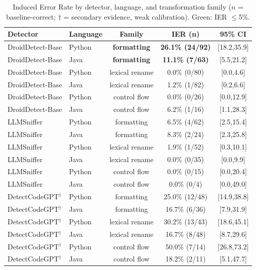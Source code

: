 \documentclass[sigconf,review,anonymous]{acmart}
\begin{document}
\begin{table}[t]
\centering
\footnotesize
\setlength{\tabcolsep}{3pt}
\caption{Induced Error Rate by detector, language, and transformation family ($n$ = baseline-correct; $\dagger$ = secondary evidence, weak calibration). Green: IER $\le$5\%.}
\label{tab:ier}
\begin{tabular}{@{}llccc@{}}
\toprule
Detector & Language & Family & IER (n) & 95\% CI \\
\midrule
DroidDetect-Base & Python & \textbf{formatting} & \textbf{26.1\% (24/92)} & [18.2,35.9] \\
DroidDetect-Base & Java & \textbf{formatting} & \textbf{11.1\% (7/63)} & [5.5,21.2] \\
DroidDetect-Base & Python & lexical rename & \cellcolor{green!20}0.0\% (0/80) & [0.0,4.6] \\
DroidDetect-Base & Java & lexical rename & \cellcolor{green!20}1.2\% (1/82) & [0.2,6.6] \\
DroidDetect-Base & Python & control flow & \cellcolor{green!20}0.0\% (0/26) & [0.0,12.9] \\
DroidDetect-Base & Java & control flow & 6.2\% (1/16) & [1.1,28.3] \\
LLMSniffer & Python & formatting & 6.5\% (4/62) & [2.5,15.4] \\
LLMSniffer & Java & formatting & 8.3\% (2/24) & [2.3,25.8] \\
LLMSniffer & Python & lexical rename & \cellcolor{green!20}1.9\% (1/52) & [0.3,10.1] \\
LLMSniffer & Java & lexical rename & \cellcolor{green!20}0.0\% (0/35) & [0.0,9.9] \\
LLMSniffer & Python & control flow & \cellcolor{green!20}0.0\% (0/15) & [0.0,20.4] \\
LLMSniffer & Java & control flow & \cellcolor{green!20}0.0\% (0/4) & [0.0,49.0] \\
DetectCodeGPT$^\dagger$ & Python & formatting & 25.0\% (12/48) & [14.9,38.8] \\
DetectCodeGPT$^\dagger$ & Java & formatting & 16.7\% (6/36) & [7.9,31.9] \\
DetectCodeGPT$^\dagger$ & Python & lexical rename & 30.2\% (13/43) & [18.6,45.1] \\
DetectCodeGPT$^\dagger$ & Java & lexical rename & 16.7\% (8/48) & [8.7,29.6] \\
DetectCodeGPT$^\dagger$ & Python & control flow & 50.0\% (7/14) & [26.8,73.2] \\
DetectCodeGPT$^\dagger$ & Java & control flow & 18.2\% (2/11) & [5.1,47.7] \\
\bottomrule
\end{tabular}
\end{table}
\end{document}
